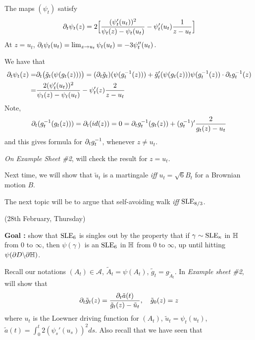 \documentclass[12pt,a4paper]{article}
\newenvironment{proof}
{\begin{changemargin}{0.5cm}{0.5cm} 
	}%
	{\end{changemargin}
}
\newenvironment{p}
{\begin{proof} 
	}%
	{\end{proof}
}
\begin{document}
\prop The maps $(\psi_t)$ satisfy
\begin{align*}
\partial_t \psi_t(z) = 2\Big[ \frac{(\psi'_t(u_t))^2}{\psi_t(z) - \psi_t(u_t)} - \psi'_t(u_t) \frac{1}{z-u_t}\Big]
\end{align*}
At $z= u_t$, $\partial_t \psi_t(u_t) = \lim_{z\rightarrow u_t} \psi_t(u_t) = -3\psi''_t(u_t)$.
\begin{p}
\pf We have that
\begin{align*}
\partial_t \psi_t(z) =& \partial_t \big( \tilde{g}_t (\psi(g_t(z)))\big) = (\partial_t \tilde{g}_t)(\psi(g_t^{-1}(z))) + \tilde{g}'_t (\psi(g_t(z))) \psi( g_t^{-1}(z) ) \cdot \partial_t g_t^{-1}(z) \\
=& \frac{2 (\psi'_t(u_t))^2}{\psi_t(z) - \psi_t(u_t)} -\psi'_t(z) \frac{2}{z-u_t}
\end{align*}
Note,
\begin{align*}
\partial_t (g_t^{-1}(g_t(z))) = \partial_t (id(z)) =0 = \partial_t g_t^{-1} (g_t(z)) + (g_t^{-1})' \frac{2}{g_t(z) - u_t}
\end{align*}
and this gives formula for $\partial_t g_t^{-1}$, whenever $z\neq u_t$.
\s

\emph{On Example Sheet \#2}, will check the result for $z= u_t$.

\eop 
\end{p}
\s

Next time, we will show that $\tilde{u}_t$ is a martingale \emph{iff} $u_t = \sqrt{6}B_t$ for a Brownian motion $B$.

\quad The next topic will be to argue that self-avoiding walk \emph{iff} $\text{SLE}_{8/3}$.
\s

\newday

(28th February, Thursday)
\s

\textbf{Goal :} show that $\text{SLE}_{6}$ is singles out by the property that if $\gamma \sim \text{SLE}_{\kappa}$ in $\mathbb{H}$ from $0$ to $\infty$, then $\psi(\gamma)$ is an $\text{SLE}_{6}$ in $\mathbb{H}$ from $0$ to $\infty$, up until hitting $\psi(\partial D \backslash \partial \mathbb{H})$. 

Recall our notations $(A_t) \in \mathscr{A}$, $\tilde{A}_t = \psi(A_t)$, $\tilde{g}_t = g_{\tilde{A}_t}$. In \emph{Example sheet \#2}, will show that 
\begin{align*}
\partial_t \tilde{g}_t(z) = \frac{\partial_t \tilde{a}(t)}{\tilde{g}_t(z) - \tilde{u}_t}, \quad \tilde{g}_0 (z) = z 
\end{align*} 
where $u_t$ is the Loewner driving function for $(A_t)$, $\tilde{u}_t = \psi_t(u_t)$, $\tilde{a}(t) = \int_0^t 2(\psi_s'(u_s))^2 ds$. Also recall that we have seen that 
\end{document}
